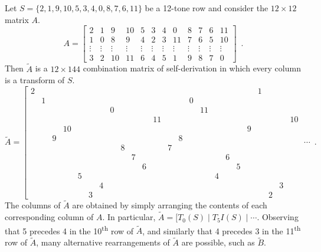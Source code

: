 \begin{example}
	\label{ex:westergaard}
	\cite[102]{Westergaard1966}
	Let $S = \{ 2, 1, 9, 10, 5, 3, 4, 0, 8, 7, 6, 11 \}$ be a 12-tone row and consider the $12 \times 12$ matrix $A$.
	\begin{equation}
    	A = \left[
    	\begin{array}{cccccccccccc}
        	2 & 1 & 9 & 10 & 5 & 3 & 4 & 0 & 8 & 7 & 6 & 11 \\
        	1 & 0 & 8 & 9 & 4 & 2 & 3 & 11 & 7 & 6 & 5 & 10 \\
        	\vdots & \vdots & \vdots & \vdots & \vdots & \vdots & \vdots & \vdots & \vdots & \vdots & \vdots & \vdots \\
        	3 & 2 & 10 & 11 & 6 & 4 & 5 & 1 & 9 & 8 & 7 & 0
    	\end{array}
    	\right] \enspace.
	\end{equation}
	Then $\tilde{A}$ is a $12 \times 144$ combination matrix of self-derivation in which every column is a transform of $S$.
	\begin{equation}
    	\tilde{A} = \left[
    	\begin{array}{cccccccccccc|cccccccccccc|}
        	2 &&&&&&&&&&&    &  &&&&&&&& 1 &&& \\
        	& 1 &&&&&&&&&&   &  && 0 &&&&&&&&& \\
        	&&&&&&& 0 &&&&   &  &&& 11 &&&&&&&& \\
        	&&&&&&&&&&& 11   &  &&&&&&&&&&& 10 \\
        	&&& 10 &&&&&&&&  &  &&&&&&& 9 &&&& \\
        	&& 9 &&&&&&&&&   &  & 8 &&&&&&&&&& \\
        	&&&&&&&& 8 &&&   &  7 &&&&&&&&&&& \\
        	&&&&&&&&& 7 &&   &  &&&&& 6 &&&&&& \\
        	&&&&&&&&&& 6 &   &  &&&&&& 5 &&&&& \\
        	&&&& 5 &&&&&&&   &  &&&& 4 &&&&&&& \\
        	&&&&&& 4 &&&&&   &  &&&&&&&&&& 3 & \\
        	&&&&& 3 &&&&&&   &  &&&&&&&&& 2 &&
    	\end{array}
    	\; \cdots \right. \enspace.
	\end{equation}
	The columns of $\tilde{A}$ are obtained by simply arranging the contents of each corresponding column of $A$. In particular, $\tilde{A} = [T_0(S) \; | \; T_5I(S) \; | \; \cdots$. Observing that 5 precedes 4 in the 10\textsuperscript{th} row of $\tilde{A}$, and similarly that 4 precedes 3 in the 11\textsuperscript{th} row of $\tilde{A}$, many alternative rearrangements of $\tilde{A}$ are possible, such as $\tilde{B}$.

\end{example}
